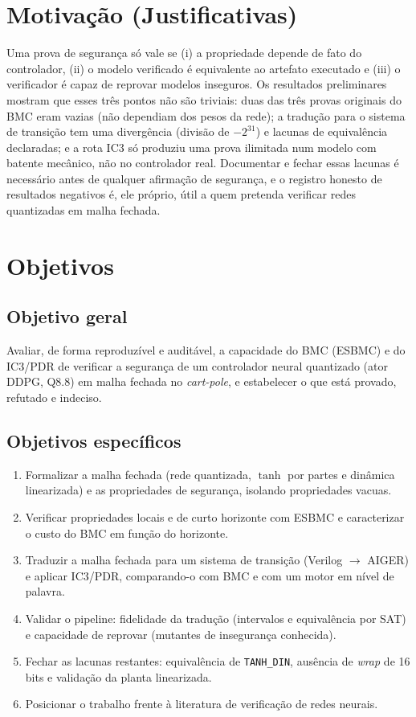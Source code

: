 \section{Motivação (Justificativas)}

Uma prova de segurança só vale se (i) a propriedade depende de fato do controlador, (ii) o modelo verificado é equivalente ao artefato executado e (iii) o verificador é capaz de reprovar modelos inseguros. Os resultados preliminares mostram que esses três pontos não são triviais: duas das três provas originais do BMC eram vazias (não dependiam dos pesos da rede); a tradução para o sistema de transição tem uma divergência (divisão de $-2^{31}$) e lacunas de equivalência declaradas; e a rota IC3 só produziu uma prova ilimitada num modelo com batente mecânico, não no controlador real. Documentar e fechar essas lacunas é necessário antes de qualquer afirmação de segurança, e o registro honesto de resultados negativos é, ele próprio, útil a quem pretenda verificar redes quantizadas em malha fechada.

\section{Objetivos}

\subsection{Objetivo geral}

Avaliar, de forma reproduzível e auditável, a capacidade do BMC (ESBMC) e do IC3/PDR de verificar a segurança de um controlador neural quantizado (ator DDPG, Q8.8) em malha fechada no \emph{cart-pole}, e estabelecer o que está provado, refutado e indeciso.

\subsection{Objetivos específicos}

\begin{enumerate}
  \item Formalizar a malha fechada (rede quantizada, $\tanh$ por partes e dinâmica linearizada) e as propriedades de segurança, isolando propriedades vacuas.
  \item Verificar propriedades locais e de curto horizonte com ESBMC e caracterizar o custo do BMC em função do horizonte.
  \item Traduzir a malha fechada para um sistema de transição (Verilog $\to$ AIGER) e aplicar IC3/PDR, comparando-o com BMC e com um motor em nível de palavra.
  \item Validar o pipeline: fidelidade da tradução (intervalos e equivalência por SAT) e capacidade de reprovar (mutantes de insegurança conhecida).
  \item Fechar as lacunas restantes: equivalência de \texttt{TANH\_DIN}, ausência de \emph{wrap} de 16 bits e validação da planta linearizada.
  \item Posicionar o trabalho frente à literatura de verificação de redes neurais.
\end{enumerate}
